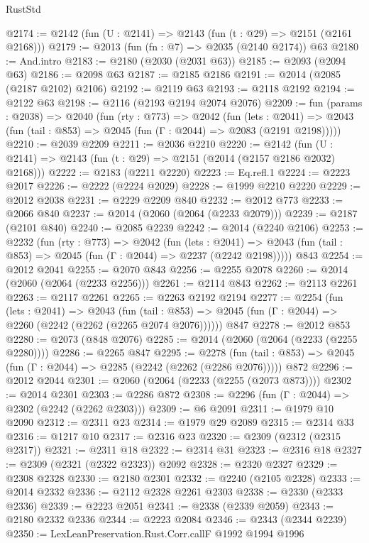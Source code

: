 \begin{lexlean}{RustStd}
\begin{coremodule}
@2174 := @2142 (fun (U : @2141) => @2143 (fun (t : @29) => @2151 (@2161 @2168)))
@2179 := @2013 (fun (fn : @7) => @2035 (@2140 @2174)) @63
@2180 := And.intro
@2183 := @2180 (@2030 (@2031 @63))
@2185 := @2093 (@2094 @63)
@2186 := @2098 @63
@2187 := @2185 @2186
@2191 := @2014 (@2085 (@2187 @2102) @2106)
@2192 := @2119 @63
@2193 := @2118 @2192
@2194 := @2122 @63
@2198 := @2116 (@2193 @2194 @2074 @2076)
@2209 := fun (params : @2038) =>
  @2040
    (fun (rty : @773) =>
    @2042
      (fun (lets : @2041) =>
      @2043 (fun (tail : @853) => @2045 (fun (Γ : @2044) => @2083 (@2191 @2198)))))
@2210 := @2039 @2209
@2211 := @2036 @2210
@2220 := @2142 (fun (U : @2141) => @2143 (fun (t : @29) => @2151 (@2014 (@2157 @2186 @2032) @2168)))
@2222 := @2183 (@2211 @2220)
@2223 := Eq.refl.{1}
@2224 := @2223 @2017
@2226 := @2222 (@2224 @2029)
@2228 := @1999 @2210 @2220
@2229 := @2012 @2038
@2231 := @2229 @2209 @840
@2232 := @2012 @773
@2233 := @2066 @840
@2237 := @2014 (@2060 (@2064 (@2233 @2079)))
@2239 := @2187 (@2101 @840)
@2240 := @2085 @2239
@2242 := @2014 (@2240 @2106)
@2253 := @2232
    (fun (rty : @773) =>
    @2042
      (fun (lets : @2041) =>
      @2043 (fun (tail : @853) => @2045 (fun (Γ : @2044) => @2237 (@2242 @2198)))))
    @843
@2254 := @2012 @2041
@2255 := @2070 @843
@2256 := @2255 @2078
@2260 := @2014 (@2060 (@2064 (@2233 @2256)))
@2261 := @2114 @843
@2262 := @2113 @2261
@2263 := @2117 @2261
@2265 := @2263 @2192 @2194
@2277 := @2254
    (fun (lets : @2041) =>
    @2043
      (fun (tail : @853) => @2045 (fun (Γ : @2044) => @2260 (@2242 (@2262 (@2265 @2074 @2076))))))
    @847
@2278 := @2012 @853
@2280 := @2073 (@848 @2076)
@2285 := @2014 (@2060 (@2064 (@2233 (@2255 @2280))))
@2286 := @2265 @847
@2295 := @2278
    (fun (tail : @853) => @2045 (fun (Γ : @2044) => @2285 (@2242 (@2262 (@2286 @2076)))))
    @872
@2296 := @2012 @2044
@2301 := @2060 (@2064 (@2233 (@2255 (@2073 @873))))
@2302 := @2014 @2301
@2303 := @2286 @872
@2308 := @2296 (fun (Γ : @2044) => @2302 (@2242 (@2262 @2303)))
@2309 := @6 @2091
@2311 := @1979 @10 @2090
@2312 := @2311 @23
@2314 := @1979 @29 @2089
@2315 := @2314 @33
@2316 := @1217 @10
@2317 := @2316 @23
@2320 := @2309 (@2312 (@2315 @2317))
@2321 := @2311 @18
@2322 := @2314 @31
@2323 := @2316 @18
@2327 := @2309 (@2321 (@2322 @2323)) @2092
@2328 := @2320 @2327
@2329 := @2308 @2328
@2330 := @2180 @2301
@2332 := @2240 (@2105 @2328)
@2333 := @2014 @2332
@2336 := @2112 @2328 @2261 @2303
@2338 := @2330 (@2333 @2336)
@2339 := @2223 @2051
@2341 := @2338 (@2339 @2059)
@2343 := @2180 @2332 @2336
@2344 := @2223 @2084
@2346 := @2343 (@2344 @2239)
@2350 := LexLeanPreservation.Rust.Corr.callF @1992 @1994 @1996

\end{coremodule}
\end{lexlean}
